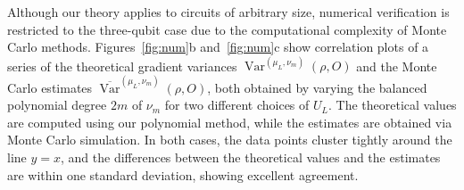 \documentclass[%
 reprint,
 superscriptaddress,
 amsmath,amssymb,
 aps, prl, twocolumn, showpacs,
]{revtex4-2}
\begin{document}
Although our theory applies to circuits of arbitrary size, numerical verification is restricted to the three-qubit case due to the computational complexity of Monte Carlo methods. 
Figures~\ref{fig:num}b and~\ref{fig:num}c show correlation plots of a series of the theoretical gradient variances $\operatorname{Var}^{(\mu_L,\nu_m)}(\rho, O)$ and the Monte Carlo estimates $\overline{\operatorname{Var}}^{(\mu_L,\nu_m)}(\rho, O)$, both obtained by varying the balanced polynomial degree $2m$ of $\nu_m$ for two different choices of $U_L$.
The theoretical values are computed using our polynomial method, while the estimates are obtained via Monte Carlo simulation. In both cases, the data points cluster tightly around the line $y=x$, and the differences between the theoretical values and the estimates are within one standard deviation, showing excellent agreement.



\end{document}
